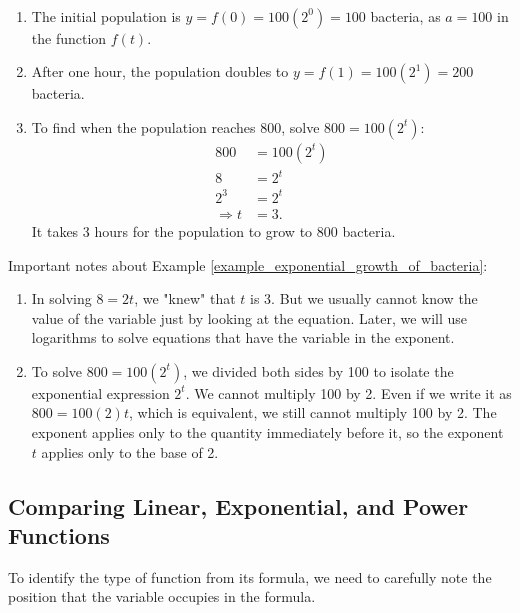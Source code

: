 \begin{solution}
    ~\\
    \begin{enumerate}
        \item The initial population is \( y = f(0) = 100(2^0) = 100 \) bacteria, as \( a = 100 \) in the function \( f(t) \).
        \item After one hour, the population doubles to \( y = f(1) = 100(2^1) = 200 \) bacteria.
        \item To find when the population reaches 800, solve \( 800 = 100(2^t) \):
              \begin{align*}
                  800           & = 100(2^t) \\
                  8             & = 2^t      \\
                  2^3           & = 2^t      \\
                  \Rightarrow t & = 3.
              \end{align*}
              It takes 3 hours for the population to grow to 800 bacteria.
    \end{enumerate}

\end{solution}

Important notes about Example \ref{example_exponential_growth_of_bacteria}:

\begin{enumerate}
    \item In solving \( 8 = 2t \), we "knew" that \( t \) is 3. But we usually cannot know the value of the variable just by looking at the equation. Later, we will use logarithms to solve equations that have the variable in the exponent.

    \item To solve \( 800 = 100(2^t) \), we divided both sides by 100 to isolate the exponential expression \( 2^t \). We cannot multiply 100 by 2. Even if we write it as \( 800 = 100(2)t \), which is equivalent, we still cannot multiply 100 by 2. The exponent applies only to the quantity immediately before it, so the exponent \( t \) applies only to the base of 2.
\end{enumerate}

\subsection{Comparing Linear, Exponential, and Power Functions}

To identify the type of function from its formula, we need to carefully note the position that the variable occupies in the formula.

